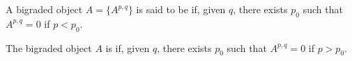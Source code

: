 A bigraded object $A = \{A^{p,q}\}$ is said to be  if, given $q$, there exists $p_0$ such that $A^{p,q} = 0$ if $p < p_0$.

The bigraded object $A$ is  if, given $q$, there exists $p_0$ such that $A^{p,q} = 0$ if $p > p_0$.
